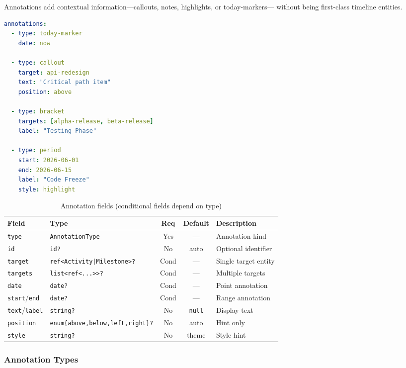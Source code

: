 Annotations add contextual information---callouts, notes, highlights, or today-markers---
without being first-class timeline entities.

\begin{lstlisting}[language=yaml,caption={Annotation examples}]
annotations:
  - type: today-marker
    date: now

  - type: callout
    target: api-redesign
    text: "Critical path item"
    position: above

  - type: bracket
    targets: [alpha-release, beta-release]
    label: "Testing Phase"

  - type: period
    start: 2026-06-01
    end: 2026-06-15
    label: "Code Freeze"
    style: highlight
\end{lstlisting}

\begin{table}[h]
\centering
\small
\begin{tabular}{llccp{4cm}}
\toprule
\textbf{Field} & \textbf{Type} & \textbf{Req} & \textbf{Default} & \textbf{Description} \\
\midrule
\texttt{type} & \texttt{AnnotationType} & Yes & --- & Annotation kind \\
\texttt{id} & \texttt{id?} & No & auto & Optional identifier \\
\texttt{target} & \texttt{ref<Activity|Milestone>?} & Cond & --- & Single target entity \\
\texttt{targets} & \texttt{list<ref<...>>?} & Cond & --- & Multiple targets \\
\texttt{date} & \texttt{date?} & Cond & --- & Point annotation \\
\texttt{start}/\texttt{end} & \texttt{date?} & Cond & --- & Range annotation \\
\texttt{text}/\texttt{label} & \texttt{string?} & No & \texttt{null} & Display text \\
\texttt{position} & \texttt{enum\{above,below,left,right\}?} & No & auto & Hint only \\
\texttt{style} & \texttt{string?} & No & theme & Style hint \\
\bottomrule
\end{tabular}
\caption{Annotation fields (conditional fields depend on type)}
\label{tab:annotation-fields}
\end{table}

\subsubsection{Annotation Types}

